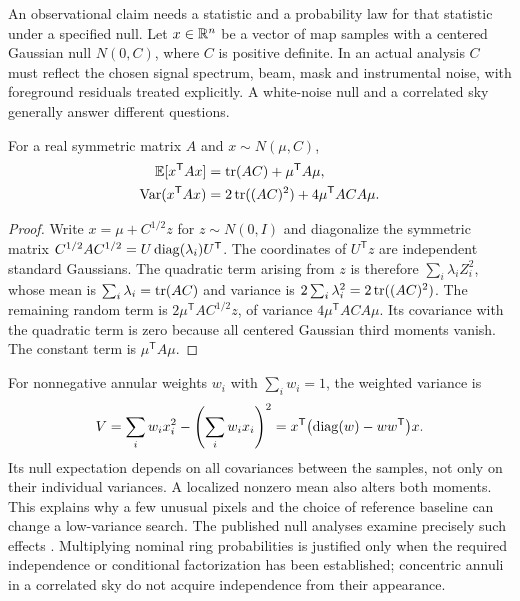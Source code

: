 An observational claim needs a statistic and a probability law for that
statistic under a specified null. Let $x\in\mathbb{R}^n$ be a vector of map
samples with a centered Gaussian null $N(0,C)$, where $C$ is positive
definite. In an actual analysis $C$ must reflect the chosen signal
spectrum, beam, mask and instrumental noise, with foreground residuals
treated explicitly. A white-noise null and a correlated sky generally
answer different questions.

\begin{proposition}
\label{prop:cc-quadratic}
For a real symmetric matrix $A$ and $x\sim N(\mu,C)$,
\begin{align*}
 \mathbb E[x^{\mathsf T}Ax]&=\operatorname{tr}(AC)+\mu^{\mathsf T}A\mu,\\
 \operatorname{Var}(x^{\mathsf T}Ax)
 &=2\operatorname{tr}((AC)^2)+4\mu^{\mathsf T}ACA\mu.
\end{align*}
\end{proposition}

\begin{proof}
Write $x=\mu+C^{1/2}z$ for $z\sim N(0,I)$ and diagonalize the symmetric
matrix $C^{1/2}AC^{1/2}=U\operatorname{diag}(\lambda_i)U^{\mathsf T}$.
The coordinates of $U^{\mathsf T}z$ are independent standard Gaussians.
The quadratic term arising from $z$ is therefore $\sum_i\lambda_i Z_i^2$,
whose mean is $\sum_i\lambda_i=\operatorname{tr}(AC)$ and variance is
$2\sum_i\lambda_i^2=2\operatorname{tr}((AC)^2)$. The remaining random term is
$2\mu^{\mathsf T}AC^{1/2}z$, of variance $4\mu^{\mathsf T}ACA\mu$.
Its covariance with the quadratic term is zero because all centered
Gaussian third moments vanish. The constant term is
$\mu^{\mathsf T}A\mu$.
\end{proof}

For nonnegative annular weights $w_i$ with $\sum_iw_i=1$, the weighted
variance is
\[
 V=\sum_iw_ix_i^2-\left(\sum_iw_ix_i\right)^2
 =x^{\mathsf T}\bigl(\operatorname{diag}(w)-ww^{\mathsf T}\bigr)x.
\]
Its null expectation depends on all covariances between the samples,
not only on their individual variances. A localized nonzero mean also
alters both moments. This explains why a few unusual pixels and the
choice of reference baseline can change a low-variance search.
The published null analyses examine precisely such effects
\citep[pp.~2--4]{CCMossScottZibin2011}
\citep[Secs.~2--3]{CCBodniaEtAl2024}. Multiplying nominal ring
probabilities is justified only when the required independence or
conditional factorization has been established; concentric annuli in
a correlated sky do not acquire independence from their appearance.


